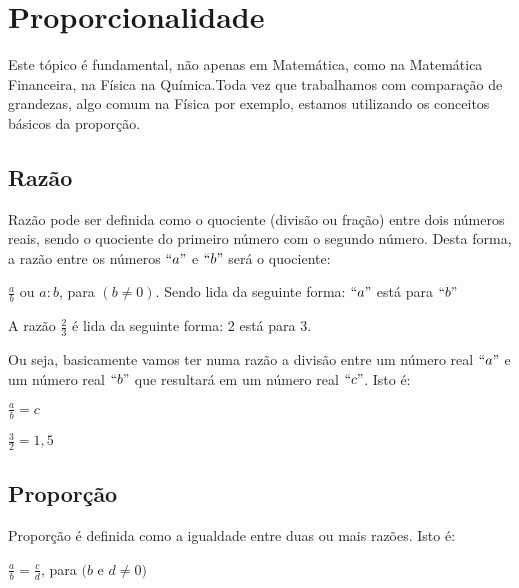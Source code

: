 \chapter{Proporcionalidade}
Este tópico é fundamental, não apenas em Matemática, como na Matemática Financeira, na Física  na Química.Toda vez que trabalhamos com comparação de grandezas, algo comum na Física por exemplo, estamos utilizando os conceitos básicos da proporção.   

\section{Razão}
\begin{definition}
    Razão pode ser definida como o quociente (divisão ou fração) entre dois números reais, sendo o quociente do primeiro número com o segundo número. Desta forma, a razão entre os números $``a"$ e $``b"$ será o quociente:
\end{definition}

	
	\begin{center}
		$\frac{a}{b}$ ou $a:b$, para $(b \neq 0)$. 	Sendo lida da seguinte forma: 
		$``a"$ está para $``b"$
	\end{center}


	\begin{example}
	A razão $\frac{2}{3}$ é lida da seguinte forma: 2 está para 3.
	\end{example}

\noindent Ou seja, basicamente vamos ter numa razão a divisão entre um número real $``a"$ e um número real $``b"$ que resultará em um número real $``c"$. Isto é:  

	\begin{center}
		$\frac{a}{b} = c$ 
	\end{center}
	
	\begin{example}
	   $\frac{3}{2} = 1,5$
	\end{example}

\section{Proporção}

\begin{definition}
    Proporção é definida como a igualdade entre duas ou mais razões. Isto é:
\end{definition}


	\begin{center}
	    $\frac{a}{b} = \frac{c}{d}$, para $(b$ e $d \neq 0)$
	\end{center}

